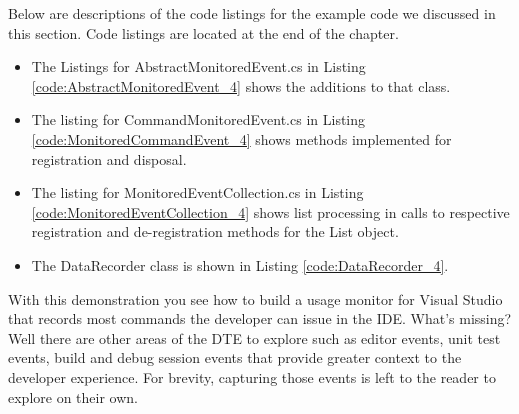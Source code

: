 Below are descriptions of the code listings for the example code we discussed in this section.  Code listings are located at the end of the chapter.
\begin{itemize}
\item
The Listings for AbstractMonitoredEvent.cs in Listing \ref{code:AbstractMonitoredEvent_4}  shows the additions to that class.  
\item
The listing for CommandMonitoredEvent.cs in Listing \ref{code:MonitoredCommandEvent_4} shows methods implemented for registration and disposal.
\item
The listing for MonitoredEventCollection.cs in Listing \ref{code:MonitoredEventCollection_4} shows list processing in calls to respective registration and de-registration methods for the List object.
\item
The DataRecorder class is shown in Listing \ref{code:DataRecorder_4}.
\end{itemize}


With this demonstration you see how to build a usage monitor for Visual Studio that records most commands the developer can issue in the IDE.  What's missing?  Well there are other areas of the DTE to explore such as editor events, unit test events, build and debug session events that provide greater context to the developer experience.  For brevity, capturing those events is left to the reader to explore on their own.




